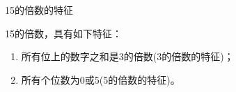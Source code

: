 \documentclass[aspectratio=169]{ctexbeamer} %
\date{\today}
\begin{document}
\begin{frame}[t]{15的倍数的特征}
\begin{spacing}{1.2}
\normalsize
15的倍数，具有如下特征：
\begin{enumerate}[label={\arabic*.}]
\item 所有位上的数字之和是3的倍数(\alert{3的倍数的特征})；
\item 所有个位数为0或5(\alert{5的倍数的特征})。
\end{enumerate}

\end{spacing}
\end{frame}
\end{document}
